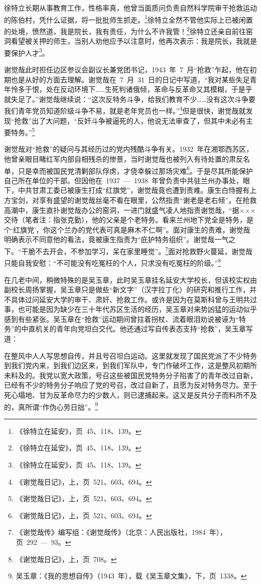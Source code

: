 徐特立长期从事教育工作，性格率真，他曾当面质问负责自然科学院审干抢救运动的陈伯村，凭什么证据，将一批批师生抓走。\footnote{《徐特立在延安》，页~45、118、139。}徐特立全然不管他实际上已被闲置的处境，愤然道，我是院长，我有责任，为什么不许我管！\footnote{《徐特立在延安》，页~45、118、139。}徐特立还亲自前往窑洞看望被关押的师生，当别人劝他应予以注意时，他再次表示：我是院长，我就是要保护人才\footnote{《徐特立在延安》，页~45、118、139。}。

谢觉哉此时担任边区参议会副议长兼党团书记，1943~年~7~月“抢救”乍起，他在初期也是从好的方面去理解。谢觉哉在~7~月~31~日的日记中写道，“我对某些失足青年怜多于恨，处在反动环境下……生死判诸俄倾，革命与反革命又其模糊，于是乎就失足了。”谢觉哉继续说：“这次反特务斗争，给我们教育不少……没有这次斗争要我们青年党员知道阶级斗争不易，就是老年党员也一样。”\footnote{《谢觉哉日记》，上，页~521、603、694。}但是很快，谢觉哉就发现“抢救”出了大问题，“反奸斗争被逼死的人，他说无法审查了，但其中未必有主要特务。”\footnote{《谢觉哉日记》，上，页~521、603、694。}

谢觉哉对“抢救”的疑问与其经历过的党内残酷斗争有关。1932~年在湘鄂西苏区，他曾亲眼目睹红军内部自相残杀的惨景，当时谢觉哉也被列入有待处置的肃反名单，只是幸而被国民党清剿部队俘虏，才侥幸躲过那场灾难\footnote{《谢觉哉日记》，上，页~521、603、694。}。于是尽其所能保护自己所在单位的干部。但因他在~1937~—~1938~年曾负责中共驻兰州办事处，眼下，中共甘肃工委已被康生打成“红旗党”，谢觉哉竟也遭到责难。康生白恃握有上方宝剑，对享有盛望的谢觉哉丝毫不看在眼里，公然指责“谢老是老右倾”。在抢救高潮中，康生直扑谢觉哉办公的窑洞，一进门就盛气凌人地指责谢觉哉，“据×××交待（笔者注：指张克勤），他的父亲是个老特务。看来兰州地下党全是特务，是个‘红旗党’，你这个兰办的党代表可真是麻木不仁啊”。面对康生的责难，谢觉哉明确表示不同意他的看法，竟被康生指责为“庇护特务组织”。谢觉哉一气之下。“干脆不去开会，不参加学习，呆在家里睡觉”。\footnote{《谢觉哉传》编写组：《谢觉哉传》（北京：人民出版社，1984~年），页~292~—~93。}面对抢救野火蔓延，谢觉哉只能自我安慰：“不可能没有吃冤枉的个人，只求没有吃冤枉的阶级。”\footnote{《谢觉哉日记》，上，页~708。}

在几老中间，稍微特殊的是吴玉章，此时吴玉章挂名延安大学校长，但该校实权由副校长周扬掌握，吴玉章只是做些“新文字”（汉字拉丁化）的研究和推行工作，并不具体过问延安大学的审干、肃奸、抢救工作。或许是因为在莫斯科曾与王明共过事，也可能是因为缺少在三十年代苏区生活的经历，吴玉章对来势凶猛的运动似乎感到有些紧张。吴玉章在“抢救”运动期间曾拄着拐杖、流着眼泪劝说被诬为“特务”的中直机关的青年向党坦白交代。他还通过写自传表态支持“抢救”，吴玉章写道：

\begin{quoting}
在整风中人人写思想自传，并且号召坦白运动。这里就发现了国民党派了不少特务到我们党内来，到我们边区来，到我们军队中，专门作破坏工作，这是整风初期所未料及的。我党以宽大政策，号召这些被国民党特务分子陷害了的青年改过自新，已经有不少的特务分子响应了党的号召，改过自新了，且愿为反对特务尽力。至于死心塌地、甘为反革命尽力的少数人，则已逮捕起来。这又是反共分子而料所不及的，真所谓“作伪心劳日拙”。\footnote{吴玉章：《我的思想自传》（1943~年），载《吴玉章文集》，下，页~1338。}
\end{quoting}

